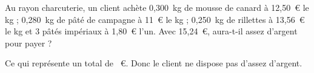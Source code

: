 Au rayon charcuterie, un client achète 0,300~kg de mousse de canard à
12,50~\textgreek{\euro} le kg ; 0,280~kg de pâté de campagne à
11~\textgreek{\euro} le kg ; 0,250~kg de rillettes à
13,56~\textgreek{\euro} le kg et 3 pâtés impériaux à 1,80~\textgreek{\euro} l'un. Avec 15,24~\textgreek{\euro}, aura-t-il assez d'argent pour payer ?
\kern1cm\kern1cm\kern1cm
\par Ce qui représente un total de ~\textgreek{\euro}. Donc le client ne dispose pas d'assez d'argent.

